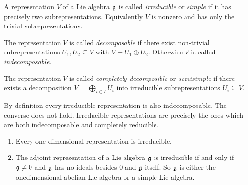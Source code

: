 \begin{defi}
 A representation $V$ of a Lie algebra $\mathfrak{g}$ is called \emph{irreducible} or \emph{simple} if it has precisely two subrepresentations. Equivalently $V$ is nonzero and has only the trivial subrepresentations.
 
 The representation $V$ is called \emph{decomposable} if there exist non-trivial subrepresentations $U_1, U_2 \subseteq V$ with $V = U_1 \oplus U_2$. Otherwise $V$ is called \emph{indecomposable}.
 
 The representation $V$ is called \emph{completely decomposible} or \emph{semisimple} if there exists a decomposition $V = \bigoplus_{i \in I} U_i$ into irreducible subrepresentations $U_i \subseteq V$.
\end{defi}


\begin{rem}
 By definition every irreducible representation is also indecomposable. The converse does not hold. Irreducible representations are precisely the ones which are both indecomposable and completely reducible.
\end{rem}


\begin{expl}
 \begin{enumerate}[leftmargin=*]
  \item
   Every one-dimensional representation is irreducible.
  \item
   The adjoint representation of a Lie algebra $\mathfrak{g}$ is irreducible if and only if $\mathfrak{g} \neq 0$ and $\mathfrak{g}$ has no ideals besides $0$ and $\mathfrak{g}$ itself. So $\mathfrak{g}$ is either the onedimensional abelian Lie algebra or a simple Lie algebra.   
 \end{enumerate}
\end{expl}


